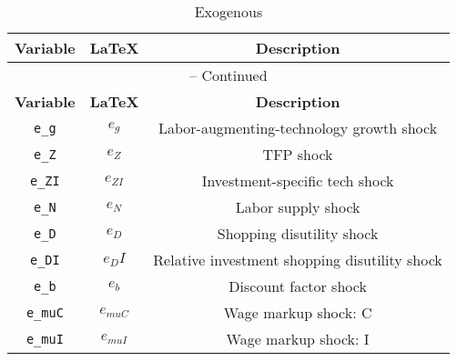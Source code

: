 \begin{center}
\begin{longtable}{ccc}
\caption{Exogenous}\\%
\hline%
\multicolumn{1}{c}{\textbf{Variable}} &
\multicolumn{1}{c}{\textbf{\LaTeX}} &
\multicolumn{1}{c}{\textbf{Description}}\\%
\hline\hline%
\endfirsthead
\multicolumn{3}{c}{{\tablename} \thetable{} -- Continued}\\%
\hline%
\multicolumn{1}{c}{\textbf{Variable}} &
\multicolumn{1}{c}{\textbf{\LaTeX}} &
\multicolumn{1}{c}{\textbf{Description}}\\%
\hline\hline%
\endhead
\texttt{e\_g} & ${e_g}$ & Labor-augmenting-technology growth shock\\
\texttt{e\_Z} & ${e_Z}$ & TFP shock\\
\texttt{e\_ZI} & ${e_{ZI}}$ & Investment-specific tech shock\\
\texttt{e\_N} & ${e_N}$ & Labor supply shock\\
\texttt{e\_D} & ${e_D}$ & Shopping disutility shock\\
\texttt{e\_DI} & ${e_DI}$ & Relative investment shopping disutility shock\\
\texttt{e\_b} & ${e_b}$ & Discount factor shock\\
\texttt{e\_muC} & ${e_{muC}}$ & Wage markup shock: C\\
\texttt{e\_muI} & ${e_{muI}}$ & Wage markup shock: I\\
\hline%
\end{longtable}
\end{center}
